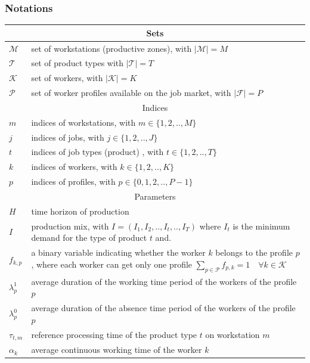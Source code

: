 \documentclass[review,12pt, 3p, times]{elsarticle}
\begin{document}
\subsubsection{Notations}
\begin{longtable}{p{} p{}}
    \hline
    \multicolumn{2}{c}{Sets }\\
    \hline
    $\mathcal{M}$ & set of workstations (productive zones), with $|\mathcal{M}|=M$                      \\
    $\mathcal{T}$ & set of  product types	with $|\mathcal{T}|=T$\\
    $\mathcal{K}$ & set of workers, with $|\mathcal{K}|=K$\\
    $\mathcal{P}$ & set of worker profiles available on the job market, with $|\mathcal{F}|=P$\\
    \hline
    \multicolumn{2}{c}{Indices }\\
    \hline
    $m$           & indices of workstations, with $m\in\{1,2,..,M\}$\\
    $j$           & indices of jobs, with $j\in\{1,2,..,J\}$\\
    $t$           & indices of job types (product) , with $t\in\{1,2,..,T\}$\\
    $k$           & indices of workers, with $k\in\{1,2,..,K\}$\\
    $p$           & indices of profiles, with $p\in\{0,1,2,..,P-1\}$\\
    \hline
    \multicolumn{2}{c}{Parameters}\\
    \hline
    $H$           & time horizon of production                                 \\
    $I$           & production mix, with $I=(I_1,I_2,..,I_t,..,I_T)$ where $I_t$ is the minimum demand for the type of product $t$ and.\\
    $f_{k,p}$     & a binary variable indicating whether the worker $k$  belongs to the profile $p$, where each worker can get only one profile $\sum_{p\in\mathcal{P}} f_{p,k} =1  \quad\forall k\in\mathcal{K}$\\
    $\lambda^1_p$ & average duration of the working time period of the workers of the profile $p$\\
    $\lambda^0_p$ & average duration of the absence time period of the workers of the profile $p$\\
    $\tau_{t,m}$  & reference processing time of the product type $t$ on workstation $m$\\
    $\alpha_k$    & average continuous working time of the worker $k$\\

\end{longtable}
\end{document}
